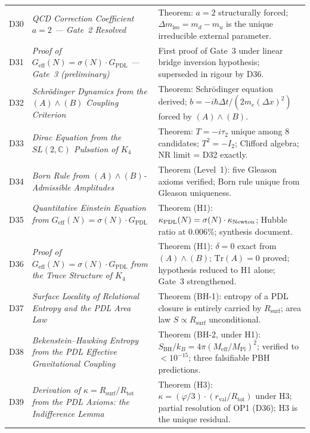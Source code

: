\documentclass[11pt,a4paper]{article}
\theoremstyle{plain}
\theoremstyle{definition}
\theoremstyle{remark}
\newcommand{\PDL}{\textnormal{PDL}}
\newcommand{\Kfour}{K_4}
\newcommand{\Geff}{G_{\mathrm{eff}}}
\newcommand{\GPDL}{G_{\mathrm{PDL}}}
\newcommand{\rval}{r_{\mathrm{val}}}
\newcommand{\Rsurf}{R_{\mathrm{surf}}}
\newcommand{\Rtot}{R_{\mathrm{tot}}}
\newcommand{\sigmaN}{\sigma(N)}
\newcommand{\SBH}{S_{\mathrm{BH}}}
\newcommand{\Meff}{M_{\mathrm{eff}}}
\newcommand{\MPl}{M_{\mathrm{Pl}}}
\begin{document}
\begin{longtable}{@{}L{1.3cm}L{3.8cm}L{8.0cm}@{}}
D30 & \textit{QCD Correction Coefficient $a=2$ — Gate~2 Resolved}~\citep{D30} & \textcolor{proofblue}{Theorem}: $a=2$ structurally forced; $\Delta m_{\mathrm{iso}}=m_d-m_u$ is the unique irreducible external parameter. \\[0.3em]

D31 & \textit{Proof of $\Geff(N)=\sigmaN\cdot\GPDL$ — Gate~3 (preliminary)}~\citep{D31} & First proof of Gate~3 under linear bridge inversion hypothesis; superseded in rigour by D36. \\[0.3em]

D32 & \textit{Schr\"odinger Dynamics from the $(A)\wedge(B)$ Coupling Criterion}~\citep{D32} & \textcolor{proofblue}{Theorem}: Schr\"odinger equation derived; $b=-i\hbar\Delta t/(2m_e(\Delta x)^2)$ forced by $(A)\wedge(B)$. \\[0.3em]

D33 & \textit{Dirac Equation from the $SL(2,\mathbb{C})$ Pulsation of $\Kfour$}~\citep{D33} & \textcolor{proofblue}{Theorem}: $T=-i\tau_2$ unique among 8 candidates; $T^2=-I_2$; Clifford algebra; NR limit = D32 exactly. \\[0.3em]

D34 & \textit{Born Rule from $(A)\wedge(B)$-Admissible Amplitudes}~\citep{D34} & \textcolor{proofblue}{Theorem (Level~1)}: five Gleason axioms verified; Born rule unique from Gleason uniqueness. \\[0.3em]

D35 & \textit{Quantitative Einstein Equation from $\Geff(N)=\sigmaN\cdot\GPDL$}~\citep{D35} & \textcolor{proofblue}{Theorem (H1)}: $\kappa_{\PDL}(N)=\sigmaN\cdot\kappa_{\mathrm{Newton}}$; Hubble ratio at 0.006\%; synthesis document. \\[0.3em]

D36 & \textit{Proof of $\Geff(N)=\sigmaN\cdot\GPDL$ from the Trace Structure of $\Kfour$}~\citep{D36} & \textcolor{proofblue}{Theorem (H1)}: $\delta=0$ exact from $(A)\wedge(B)$; $\mathrm{Tr}(A)=0$ proved; hypothesis reduced to H1 alone; Gate~3 strengthened. \\[0.4em]

D37 & \textit{Surface Locality of Relational Entropy and the PDL Area Law}~\citep{D37} & \textcolor{proofblue}{Theorem (BH-1)}: entropy of a PDL closure is entirely carried by $\Rsurf$; area law $S\propto\Rsurf$ unconditional. \\[0.3em]

D38 & \textit{Bekenstein--Hawking Entropy from the PDL Effective Gravitational Coupling}~\citep{D38} & \textcolor{proofblue}{Theorem (BH-2, under H1)}: $\SBH/k_B=4\pi(\Meff/\MPl)^2$; verified to $<10^{-15}$; three falsifiable PBH predictions. \\[0.3em]

D39 & \textit{Derivation of $\kappa=\Rsurf/\Rtot$ from the PDL Axioms: the Indifference Lemma}~\citep{D39} & \textcolor{proofblue}{Theorem (H3)}: $\kappa=(\varphi/3)\cdot(\rval/\Rtot)$ under H3; partial resolution of OP1 (D36); H3 is the unique residual. \\[0.4em]

\end{longtable}
\end{document}
